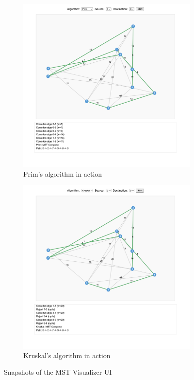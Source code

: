 \documentclass[12pt]{article}
\begin{document}
\begin{figure}[h]
    \centering
    \begin{subfigure}{0.48\textwidth}
      \includegraphics[width=\linewidth]{images/vis_prim.png}
      \caption{Prim's algorithm in action}
    \end{subfigure}\hfill
    \begin{subfigure}{0.48\textwidth}
      \includegraphics[width=\linewidth]{images/vis_kruskal.png}
      \caption{Kruskal's algorithm in action}
    \end{subfigure}
    \caption{Snapshots of the MST Visualizer UI}
    \label{fig:ui}
\end{figure}
\end{document}
